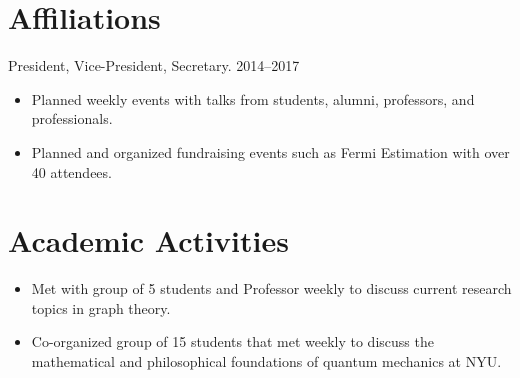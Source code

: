\documentclass{cultvoucher}
\begin{document}



\section{Affiliations}



{{\small{President, Vice-President, Secretary.}}}
{2014--2017}
\begin{itemize}
	\item Planned weekly events with talks from students, alumni, professors,
	      and professionals.
	\item Planned and organized fundraising events such as Fermi Estimation
	      with over 40 attendees.
\end{itemize}

\section{Academic Activities}
\begin{itemize}
	\item Met with group of 5 students and Professor weekly to discuss current
	      research topics in graph theory.
\end{itemize}

\begin{itemize}
	\item Co-organized group of 15 students that met weekly to discuss the
	      mathematical and philosophical foundations of quantum mechanics at
	      NYU.
\end{itemize}
\end{document}
